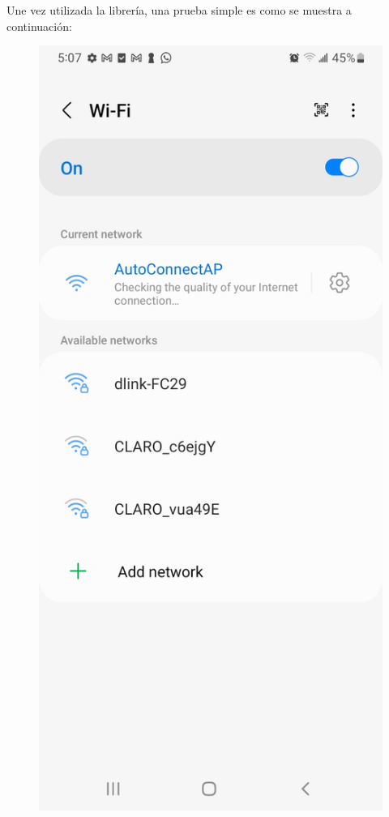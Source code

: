\documentclass[oneside]{article}
\begin{document}
Une vez utilizada la librería, una prueba simple es como se muestra a continuación:

\begin{figure}[H]
\centering
\includegraphics[scale=.15]{images/wifi_config1.jpg}

\end{figure}
\end{document}
